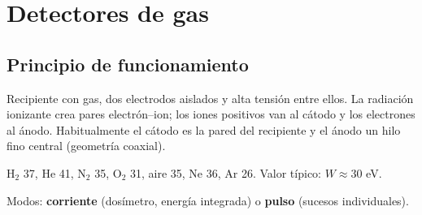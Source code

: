 \chapter{Detectores de gas}

\section{Principio de funcionamiento}
Recipiente con gas, dos electrodos aislados y alta tensión entre ellos. La radiación ionizante crea
pares electrón--ion; los iones positivos van al cátodo y los electrones al ánodo. Habitualmente el
cátodo es la pared del recipiente y el ánodo un hilo fino central (geometría coaxial).
\begin{dato}
H$_2$ 37, He 41, N$_2$ 35, O$_2$ 31, aire 35, Ne 36, Ar 26. Valor típico: $W\approx30$ eV.
\end{dato}
Modos: \textbf{corriente} (dosímetro, energía integrada) o \textbf{pulso} (sucesos individuales).

